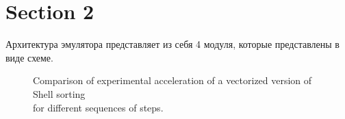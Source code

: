 \documentclass[
11pt,%
tightenlines,%
twoside,%
onecolumn,%
nofloats,%
nobibnotes,%
nofootinbib,%
superscriptaddress,%
noshowpacs,%
centertags]%
{revtex4}
\begin{document}
     
\section{Section 2}

Архитектура эмулятора представляет из себя 4 модуля, которые представлены в виде схеме.

\begin{figure}[h!]
\setcaptionmargin{5mm}
\onelinecaptionsfalse
{}
\caption{Comparison of experimental acceleration of a vectorized version of Shell sorting \\ for different sequences of steps.}
\label{shell-sorting-scheme}
\end{figure}
\end{document}
